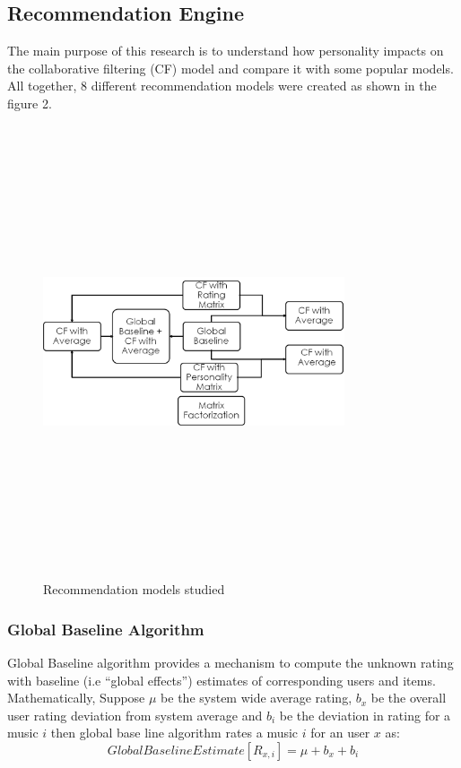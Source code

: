 \documentclass[journal]{IEEEtran}
\begin{document}
\subsection{Recommendation Engine}
The main purpose of this research is to understand how personality impacts on the collaborative filtering (CF) model and compare it with some popular models. All together, 8 different recommendation models were created as shown in the figure 2.
\begin{figure}[!h]
\centering
\includegraphics[width=3.5in,height=5.25in,clip,keepaspectratio]{recommendation_models.png}
\caption{Recommendation models studied}
\label{fig:2}
\end{figure}

\subsubsection{Global Baseline Algorithm}
Global Baseline algorithm provides a mechanism to compute the unknown rating with baseline (i.e ``global effects'') estimates of corresponding users and items.
Mathematically,
Suppose $\mu$ be the system wide average rating, $b_x$ be the overall user rating deviation from system average and $b_i$ be the deviation in rating for a music $i$ then global base line algorithm rates a music $i$ for an user $x$ as:
\begin{equation}\label{eq:baseline}
  Global Baseline Estimate[R_{x,i}] = \mu + b_x + b_i
\end{equation}
\end{document}
